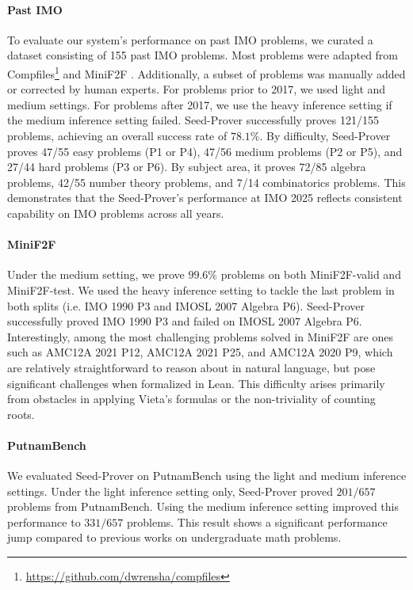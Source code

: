\paragraph{Past IMO} To evaluate our system's performance on past IMO problems, we curated a dataset consisting of 155 past IMO problems. Most problems were adapted from Compfiles\footnote{\url{https://github.com/dwrensha/compfiles}} and MiniF2F \citep{zhengminif2f}. Additionally, a subset of problems was manually added or corrected by human experts.
For problems prior to 2017, we used light and medium settings. For problems after 2017, we use the heavy inference setting if the medium inference setting failed.
Seed-Prover successfully proves 121/155 problems, achieving an overall success rate of $78.1\%$.
By difficulty, Seed-Prover proves 47/55 easy problems (P1 or P4), 47/56 medium problems (P2 or P5), and 27/44 hard problems (P3 or P6).
By subject area, it proves 72/85 algebra problems, 42/55 number theory problems, and 7/14 combinatorics problems.
This demonstrates that the Seed-Prover's performance at IMO 2025 reflects consistent capability on IMO problems across all years.

\paragraph{MiniF2F \citep{zhengminif2f}} Under the medium setting, we prove $99.6\%$ problems on both MiniF2F-valid and MiniF2F-test. We used the heavy inference setting to tackle the last problem in both splits (i.e. IMO 1990 P3 and IMOSL 2007 Algebra P6). Seed-Prover successfully proved IMO 1990 P3 and failed on IMOSL 2007 Algebra P6.
Interestingly, among the most challenging problems solved in MiniF2F are ones such as AMC12A 2021 P12, AMC12A 2021 P25, and AMC12A 2020 P9, which are relatively straightforward to reason about in natural language, but pose significant challenges when formalized in Lean. This difficulty arises primarily from obstacles in applying Vieta’s formulas or the non-triviality of counting roots.

\paragraph{PutnamBench \citep{tsoukalasputnambench}} We evaluated Seed-Prover on PutnamBench using the light and medium inference settings. Under the light inference setting only, Seed-Prover proved $201/657$ problems from PutnamBench. Using the medium inference setting improved this performance to $331/657$ problems. This result shows a significant performance jump compared to previous works on undergraduate math problems.

